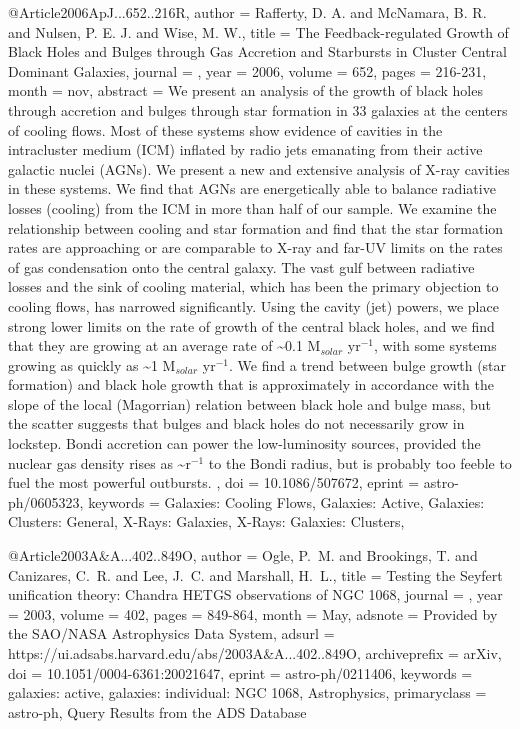 \documentclass[longauth]{aa}
\begin{document}
{{{{{{{{{{@Article{2006ApJ...652..216R,
  author   = {Rafferty, D. A. and McNamara, B. R. and Nulsen, P. E. J. and Wise, M. W.},
  title    = {The Feedback-regulated Growth of Black Holes and Bulges through Gas Accretion and Starbursts in Cluster Central Dominant Galaxies},
  journal  = {\apj},
  year     = {2006},
  volume   = {652},
  pages    = {216-231},
  month    = nov,
  abstract = {We present an analysis of the growth of black holes through accretion
and bulges through star formation in 33 galaxies at the centers of
cooling flows. Most of these systems show evidence of cavities in the
intracluster medium (ICM) inflated by radio jets emanating from their
active galactic nuclei (AGNs). We present a new and extensive analysis
of X-ray cavities in these systems. We find that AGNs are energetically
able to balance radiative losses (cooling) from the ICM in more than
half of our sample. We examine the relationship between cooling and star
formation and find that the star formation rates are approaching or are
comparable to X-ray and far-UV limits on the rates of gas condensation
onto the central galaxy. The vast gulf between radiative losses and the
sink of cooling material, which has been the primary objection to
cooling flows, has narrowed significantly. Using the cavity (jet)
powers, we place strong lower limits on the rate of growth of the
central black holes, and we find that they are growing at an average
rate of \~{}0.1 M$_{solar}$ yr$^{-1}$, with some systems
growing as quickly as \~{}1 M$_{solar}$ yr$^{-1}$. We find a
trend between bulge growth (star formation) and black hole growth that
is approximately in accordance with the slope of the local (Magorrian)
relation between black hole and bulge mass, but the scatter suggests
that bulges and black holes do not necessarily grow in lockstep. Bondi
accretion can power the low-luminosity sources, provided the nuclear gas
density rises as \~{}r$^{-1}$ to the Bondi radius, but is probably
too feeble to fuel the most powerful outbursts.
},
  doi      = {10.1086/507672},
  eprint   = {astro-ph/0605323},
  keywords = {Galaxies: Cooling Flows, Galaxies: Active, Galaxies: Clusters: General, X-Rays: Galaxies, X-Rays: Galaxies: Clusters},
}

@Article{2003A&A...402..849O,
  author        = {{Ogle}, P.~M. and {Brookings}, T. and {Canizares}, C.~R. and {Lee}, J.~C. and {Marshall}, H.~L.},
  title         = {Testing the Seyfert unification theory: Chandra HETGS observations of NGC 1068},
  journal       = {\aap},
  year          = {2003},
  volume        = {402},
  pages         = {849-864},
  month         = {May},
  adsnote       = {Provided by the SAO/NASA Astrophysics Data System},
  adsurl        = {https://ui.adsabs.harvard.edu/abs/2003A&A...402..849O},
  archiveprefix = {arXiv},
  doi           = {10.1051/0004-6361:20021647},
  eprint        = {astro-ph/0211406},
  keywords      = {galaxies: active, galaxies: individual: NGC 1068, Astrophysics},
  primaryclass  = {astro-ph},
}
Query Results from the ADS Database


}}}}}}}}}}
\end{document}
